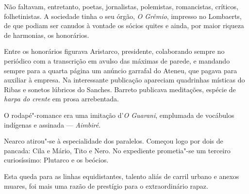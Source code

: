 Não faltavam,
entretanto, poetas, jornalistas, polemistas, romancistas, críticos,
folhetinistas. A sociedade tinha o seu órgão, \textit{O Grêmio}, impresso no
Lombaerts, de que podiam ser canudos à vontade os sócios quites e
ainda, por maior riqueza de harmonias, os honorários. 

Entre os
honorários figurava Aristarco, presidente, colaborando sempre no
periódico com a transcrição em avulso das máximas de parede, e mandando
sempre para a quarta página um anúncio garrafal do Ateneu, que pagava
para auxiliar à empresa. Na interessante publicação apareciam
quadrinhas místicas do Ribas e sonetos lúbricos do Sanches. Barreto
publicava meditações, espécie de \textit{harpa do crente} em prosa arrebentada.

O rodapé"-romance era uma imitação d'\textit{O Guarani}, emplumada de vocábulos
indígenas e assinada --- \textit{Aimbiré}. 

Nearco atirou"-se à especialidade dos
paralelos. Começou logo por dois de pancada: Cila e Mário, Tito e Nero.
No expediente prometia"-se um terceiro curiosíssimo: Plutarco e os
beócios. 

Esta queda para as linhas equidistantes, talento aliás de
carril urbano e anexos muares, foi mais uma razão de prestígio para o
extraordinário rapaz. 

